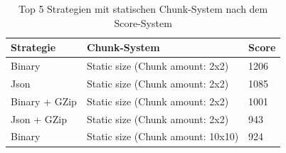 \begin{table}[htp]
    \centering
    \caption{Top 5 Strategien mit statischen Chunk-System nach dem Score-System}
    \begin{tabular}{|l|l|l|}
    \hline
        Strategie & Chunk-System & Score \\
        \hline
        Binary & Static size (Chunk amount: 2x2) & 1206\\
        Json & Static size (Chunk amount: 2x2) & 1085\\
        Binary + GZip & Static size (Chunk amount: 2x2) & 1001\\
        Json + GZip & Static size (Chunk amount: 2x2) & 943\\
        Binary & Static size (Chunk amount: 10x10) & 924\\
        \hline
    \end{tabular}
    \label{tbl:topStatic}
\end{table}

